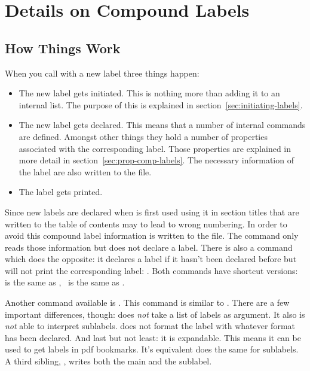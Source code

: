 \documentclass[load-preamble+,babel-options={ngerman,british,american}]{cnltx-doc}
\begin{document}
\section{Details on Compound Labels}\label{sec:deta-comp-labels}
\subsection{How Things Work}\label{sec:how-things-work}

When you call  with a new label three things happen:
\begin{itemize}
  \item The new label gets initiated.  This is nothing more than adding it to
    an internal list.  The purpose of this is explained in
    section~\ref{sec:initiating-labels}.
  \item The new label gets declared.  This means that a number of internal
    commands are defined.  Amongst other things they hold a number of
    properties associated with the corresponding label.  Those properties are
    explained in more detail in section~\ref{sec:prop-comp-labels}.  The
    necessary information of the label are also written to the 
    file.
  \item The label gets printed.
\end{itemize}

Since new labels are declared when  is first used using it in section
titles that are written to the table of contents may to lead to wrong
numbering.  In order to avoid this compound label information is written to
the  file.  The command 
only reads those information but does not declare a label.  There is also a
command which does the opposite: it declares a label if it hasn't been
declared before but will not print the corresponding label:
.  Both commands have shortcut
versions: \code{+} is the same as , \sarg\ is
the same as .

Another command available is .  This command is
similar to .  There are a few important differences, though:
 does \emph{not} take a list of labels as argument.  It also is
\emph{not} able to interpret sublabels.   does not format the
label with whatever format has been declared.  And last but not least: it is
expandable.  This means it can be used to get labels in \ac{pdf} bookmarks.
It's equivalent  does
the same for sublabels.  A third sibling, , writes both the main and the sublabel.
\end{document}
